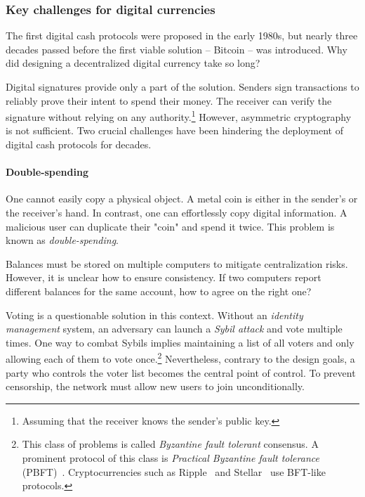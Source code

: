 \subsubsection*{Key challenges for digital currencies}

The first digital cash protocols were proposed in the early 1980s, but nearly three decades passed before the first viable solution -- Bitcoin -- was introduced.
Why did designing a decentralized digital currency take so long?

Digital signatures provide only a part of the solution.
Senders sign transactions to reliably prove their intent to spend their money.
The receiver can verify the signature without relying on any authority.\footnote{Assuming that the receiver knows the sender's public key.}
However, asymmetric cryptography is not sufficient.
Two crucial challenges have been hindering the deployment of digital cash protocols for decades.

\paragraph{Double-spending}

One cannot easily copy a physical object.
A metal coin is either in the sender's or the receiver's hand.
In contrast, one can effortlessly copy digital information.
A malicious user can duplicate their "coin" and spend it twice.
This problem is known as \textit{double-spending}.

Balances must be stored on multiple computers to mitigate centralization risks.
However, it is unclear how to ensure consistency.
If two computers report different balances for the same account, how to agree on the right one?

Voting is a questionable solution in this context.
Without an \textit{identity management} system, an adversary can launch a \textit{Sybil attack} and vote multiple times.
One way to combat Sybils implies maintaining a list of all voters and only allowing each of them to vote once.\footnote{This class of problems is called \textit{Byzantine fault tolerant} consensus.
A prominent protocol of this class is \textit{Practical Byzantine fault tolerance} (PBFT)~\cite{Castro2002}.
Cryptocurrencies such as Ripple~\cite{Chase2018} and Stellar~\cite{Mazieres2014} use BFT-like protocols.}
Nevertheless, contrary to the design goals, a party who controls the voter list becomes the central point of control.
To prevent censorship, the network must allow new users to join unconditionally.

